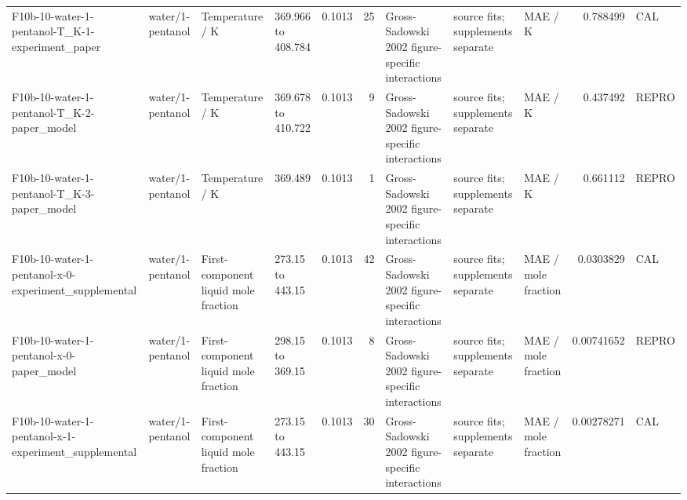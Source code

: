 \begin{landscape}
\begin{longtable}{L{1.9cm}L{2.5cm}L{2.1cm}L{1.6cm}L{1.6cm}rL{2.4cm}L{1.9cm}L{2.2cm}rL{1cm}}
F10b-\allowbreak{}10-\allowbreak{}water-\allowbreak{}1-\allowbreak{}pentanol-\allowbreak{}T\_\allowbreak{}K-\allowbreak{}1-\allowbreak{}experiment\_\allowbreak{}paper & water/\allowbreak{}1-\allowbreak{}pentanol & Temperature /\allowbreak{} K & 369.966 to 408.784 & 0.1013 & 25 & Gross-\allowbreak{}Sadowski 2002 figure-\allowbreak{}specific interactions & source fits; supplements separate & MAE /\allowbreak{} K & 0.788499 & CAL \\
F10b-\allowbreak{}10-\allowbreak{}water-\allowbreak{}1-\allowbreak{}pentanol-\allowbreak{}T\_\allowbreak{}K-\allowbreak{}2-\allowbreak{}paper\_\allowbreak{}model & water/\allowbreak{}1-\allowbreak{}pentanol & Temperature /\allowbreak{} K & 369.678 to 410.722 & 0.1013 & 9 & Gross-\allowbreak{}Sadowski 2002 figure-\allowbreak{}specific interactions & source fits; supplements separate & MAE /\allowbreak{} K & 0.437492 & REPRO \\
F10b-\allowbreak{}10-\allowbreak{}water-\allowbreak{}1-\allowbreak{}pentanol-\allowbreak{}T\_\allowbreak{}K-\allowbreak{}3-\allowbreak{}paper\_\allowbreak{}model & water/\allowbreak{}1-\allowbreak{}pentanol & Temperature /\allowbreak{} K & 369.489 & 0.1013 & 1 & Gross-\allowbreak{}Sadowski 2002 figure-\allowbreak{}specific interactions & source fits; supplements separate & MAE /\allowbreak{} K & 0.661112 & REPRO \\
F10b-\allowbreak{}10-\allowbreak{}water-\allowbreak{}1-\allowbreak{}pentanol-\allowbreak{}x-\allowbreak{}0-\allowbreak{}experiment\_\allowbreak{}supplemental & water/\allowbreak{}1-\allowbreak{}pentanol & First-\allowbreak{}component liquid mole fraction & 273.15 to 443.15 & 0.1013 & 42 & Gross-\allowbreak{}Sadowski 2002 figure-\allowbreak{}specific interactions & source fits; supplements separate & MAE /\allowbreak{} mole fraction & 0.0303829 & CAL \\
F10b-\allowbreak{}10-\allowbreak{}water-\allowbreak{}1-\allowbreak{}pentanol-\allowbreak{}x-\allowbreak{}0-\allowbreak{}paper\_\allowbreak{}model & water/\allowbreak{}1-\allowbreak{}pentanol & First-\allowbreak{}component liquid mole fraction & 298.15 to 369.15 & 0.1013 & 8 & Gross-\allowbreak{}Sadowski 2002 figure-\allowbreak{}specific interactions & source fits; supplements separate & MAE /\allowbreak{} mole fraction & 0.00741652 & REPRO \\
F10b-\allowbreak{}10-\allowbreak{}water-\allowbreak{}1-\allowbreak{}pentanol-\allowbreak{}x-\allowbreak{}1-\allowbreak{}experiment\_\allowbreak{}supplemental & water/\allowbreak{}1-\allowbreak{}pentanol & First-\allowbreak{}component liquid mole fraction & 273.15 to 443.15 & 0.1013 & 30 & Gross-\allowbreak{}Sadowski 2002 figure-\allowbreak{}specific interactions & source fits; supplements separate & MAE /\allowbreak{} mole fraction & 0.00278271 & CAL \\

\end{longtable}
\end{landscape}
